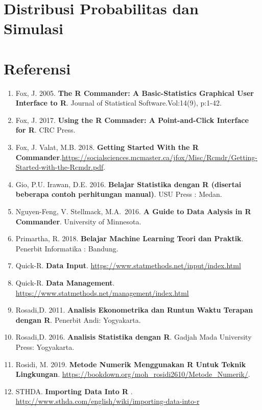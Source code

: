 \documentclass[12pt,]{krantz}
\providecommand{\tightlist}{%
  \setlength{\itemsep}{0pt}\setlength{\parskip}{0pt}}
\begin{document}
\hypertarget{distribusi-probabilitas-dan-simulasi}{%
\chapter{Distribusi Probabilitas dan Simulasi}\label{distribusi-probabilitas-dan-simulasi}}

\hypertarget{referensi}{%
\chapter*{Referensi}\label{referensi}}


\begin{enumerate}
\def\labelenumi{\arabic{enumi}.}
\tightlist
\item
  Fox, J. 2005. \textbf{The R Commander: A Basic-Statistics Graphical User Interface to R}. Journal of Statistical Software.Vol:14(9), p:1-42.
\item
  Fox, J. 2017. \textbf{Using the R Commader: A Point-and-Click Interface for R}. CRC Press.
\item
  Fox, J. Valat, M.B. 2018. \textbf{Getting Started With the R Commander}.\url{https://socialsciences.mcmaster.ca/jfox/Misc/Rcmdr/Getting-Started-with-the-Rcmdr.pdf}.
\item
  Gio, P.U. Irawan, D.E. 2016. \textbf{Belajar Statistika dengan R (disertai beberapa contoh perhitungan manual)}. USU Press : Medan.
\item
  Nguyen-Feng, V. Stellmack, M.A.~2016. \textbf{A Guide to Data Aalysis in R Commander}. University of Minnesota.
\item
  Primartha, R. 2018. \textbf{Belajar Machine Learning Teori dan Praktik}. Penerbit Informatika : Bandung.
\item
  Quick-R. \textbf{Data Input}. \url{https://www.statmethods.net/input/index.html}
\item
  Quick-R. \textbf{Data Management}. \url{https://www.statmethods.net/management/index.html}
\item
  Rosadi,D. 2011. \textbf{Analisis Ekonometrika dan Runtun Waktu Terapan dengan R}. Penerbit Andi: Yogyakarta.
\item
  Rosadi,D. 2016. \textbf{Analisis Statistika dengan R}. Gadjah Mada University Press: Yogyakarta.
\item
  Rosidi, M. 2019. \textbf{Metode Numerik Menggunakan R Untuk Teknik Lingkungan}. \url{https://bookdown.org/moh_rosidi2610/Metode_Numerik/}.
\item
  STHDA. \textbf{Importing Data Into R }. \url{http://www.sthda.com/english/wiki/importing-data-into-r}

\end{enumerate}
\end{document}
